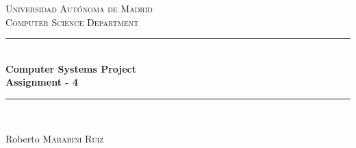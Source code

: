 \documentclass[12pt]{article} %
\begin{document}

\begin{titlepage}

\newcommand{\HRule}{\rule{\linewidth}{0.5mm}} %

\center %

\textsc{\LARGE Universidad Aut\'{o}noma de Madrid}\\[1.5cm] %
\textsc{\Large Computer Science Department}\\[0.5cm] %

\HRule \\[0.4cm]
{ \huge \bfseries Computer Systems Project\\[0.5cm] Assignment - 4}\\[0.4cm] %
\HRule \\[1.5cm]





\vfill %
\begin{flushright}
 \large
Roberto  \textsc{Marabini Ruiz} %
\end{flushright}

\end{titlepage}
\end{document}
